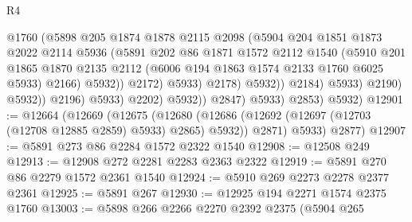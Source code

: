 \begin{lexlean}{R4}
\begin{coremodule}
                                        @1760
                                        (@5898
                                          @205
                                          @1874
                                          @1878
                                          @2115
                                          @2098
                                          (@5904
                                            @204
                                            @1851
                                            @1873
                                            @2022
                                            @2114
                                            @5936
                                            (@5891
                                              @202
                                              @86
                                              @1871
                                              @1572
                                              @2112
                                              @1540
                                              (@5910
                                                @201
                                                @1865
                                                @1870
                                                @2135
                                                @2112
                                                (@6006 @194 @1863 @1574 @2133 @1760 @6025 @5933)
                                                @2166)
                                              @5932))
                                          @2172)
                                        @5933)
                                      @2178)
                                    @5932))
                                @2184)
                              @5933)
                            @2190)
                          @5932))
                      @2196)
                    @5933)
                  @2202)
                @5932))
            @2847)
          @5933)
        @2853)
      @5932)
@12901 := @12664
    (@12669
      (@12675
        (@12680 (@12686 (@12692 (@12697 (@12703 (@12708 @12885 @2859) @5933) @2865) @5932)) @2871)
        @5933)
      @2877)
@12907 := @5891 @273 @86 @2284 @1572 @2322 @1540
@12908 := @12508 @249
@12913 := @12908 @272 @2281 @2283 @2363 @2322
@12919 := @5891 @270 @86 @2279 @1572 @2361 @1540
@12924 := @5910 @269 @2273 @2278 @2377 @2361
@12925 := @5891 @267
@12930 := @12925 @194 @2271 @1574 @2375 @1760
@13003 := @5898
    @266
    @2266
    @2270
    @2392
    @2375
    (@5904
      @265

\end{coremodule}
\end{lexlean}
